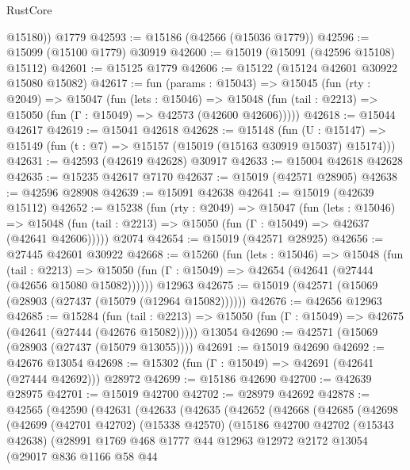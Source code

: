 \begin{lexlean}{RustCore}
\begin{coremodule}
        @15180))
    @1779
@42593 := @15186 (@42566 (@15036 @1779))
@42596 := @15099 (@15100 @1779) @30919
@42600 := @15019 (@15091 (@42596 @15108) @15112)
@42601 := @15125 @1779
@42606 := @15122 (@15124 @42601 @30922 @15080 @15082)
@42617 := fun (params : @15043) =>
  @15045
    (fun (rty : @2049) =>
    @15047
      (fun (lets : @15046) =>
      @15048 (fun (tail : @2213) => @15050 (fun (Γ : @15049) => @42573 (@42600 @42606)))))
@42618 := @15044 @42617
@42619 := @15041 @42618
@42628 := @15148
    (fun (U : @15147) => @15149 (fun (t : @7) => @15157 (@15019 (@15163 @30919 @15037) @15174)))
@42631 := @42593 (@42619 @42628) @30917
@42633 := @15004 @42618 @42628
@42635 := @15235 @42617 @7170
@42637 := @15019 (@42571 @28905)
@42638 := @42596 @28908
@42639 := @15091 @42638
@42641 := @15019 (@42639 @15112)
@42652 := @15238
    (fun (rty : @2049) =>
    @15047
      (fun (lets : @15046) =>
      @15048 (fun (tail : @2213) => @15050 (fun (Γ : @15049) => @42637 (@42641 @42606)))))
    @2074
@42654 := @15019 (@42571 @28925)
@42656 := @27445 @42601 @30922
@42668 := @15260
    (fun (lets : @15046) =>
    @15048
      (fun (tail : @2213) =>
      @15050 (fun (Γ : @15049) => @42654 (@42641 (@27444 (@42656 @15080 @15082))))))
    @12963
@42675 := @15019 (@42571 (@15069 (@28903 (@27437 (@15079 (@12964 @15082))))))
@42676 := @42656 @12963
@42685 := @15284
    (fun (tail : @2213) => @15050 (fun (Γ : @15049) => @42675 (@42641 (@27444 (@42676 @15082)))))
    @13054
@42690 := @42571 (@15069 (@28903 (@27437 (@15079 @13055))))
@42691 := @15019 @42690
@42692 := @42676 @13054
@42698 := @15302 (fun (Γ : @15049) => @42691 (@42641 (@27444 @42692))) @28972
@42699 := @15186 @42690
@42700 := @42639 @28975
@42701 := @15019 @42700
@42702 := @28979 @42692
@42878 := @42565
    (@42590
      (@42631
        (@42633
          (@42635
            (@42652
              (@42668
                (@42685
                  (@42698
                    (@42699
                      (@42701 @42702)
                      (@15338 @42570)
                      (@15186
                        @42700
                        @42702
                        (@15343 @42638)
                        (@28991
                          @1769
                          @468
                          @1777
                          @44
                          @12963
                          @12972
                          @2172
                          @13054
                          (@29017
                            @836
                            @1166
                            @58
                            @44

\end{coremodule}
\end{lexlean}
